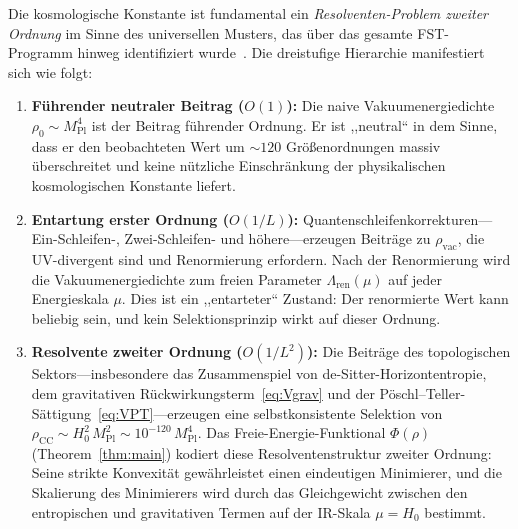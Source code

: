 \documentclass[12pt,a4paper]{article}
\theoremstyle{definition}
\theoremstyle{plain}
\theoremstyle{remark}
\begin{document}
Die kosmologische Konstante ist fundamental ein
\emph{Resolventen-Problem zweiter Ordnung} im Sinne des universellen
Musters, das \"uber das gesamte FST-Programm hinweg identifiziert
wurde~\cite{FST-Unified2026,GeigerRH2026c}. Die dreistufige Hierarchie
manifestiert sich wie folgt:

\begin{enumerate}
  \item \textbf{F\"uhrender neutraler Beitrag ($O(1)$):}\; Die naive
        Vakuumenergiedichte $\rho_0 \sim M_{\mathrm{Pl}}^4$ ist der
        Beitrag f\"uhrender Ordnung. Er ist ,,neutral`` in dem Sinne,
        dass er den beobachteten Wert um $\sim 120$ Gr\"o\ss enordnungen
        massiv \"uberschreitet und keine n\"utzliche Einschr\"ankung der
        physikalischen kosmologischen Konstante liefert.
  \item \textbf{Entartung erster Ordnung ($O(1/L)$):}\;
        Quantenschleifenkorrekturen---Ein-Schleifen-, Zwei-Schleifen- und
        h\"ohere---erzeugen Beitr\"age zu $\rho_{\mathrm{vac}}$, die
        UV-divergent sind und Renormierung erfordern. Nach der
        Renormierung wird die Vakuumenergiedichte zum freien Parameter
        $\Lambda_{\mathrm{ren}}(\mu)$ auf jeder Energieskala $\mu$. Dies
        ist ein ,,entarteter`` Zustand: Der renormierte Wert kann beliebig
        sein, und kein Selektionsprinzip wirkt auf dieser Ordnung.
  \item \textbf{Resolvente zweiter Ordnung ($O(1/L^2)$):}\; Die
        Beitr\"age des topologischen Sektors---insbesondere das
        Zusammenspiel von de-Sitter-Horizontentropie, dem gravitativen
        R\"uckwirkungsterm~\eqref{eq:Vgrav} und der
        P\"oschl--Teller-S\"attigung~\eqref{eq:VPT}---erzeugen eine
        selbstkonsistente Selektion von $\rho_{\mathrm{CC}} \sim
        H_0^2\,M_{\mathrm{Pl}}^2 \sim 10^{-120}\,M_{\mathrm{Pl}}^4$.
        Das Freie-Energie-Funktional $\Phi(\rho)$
        (Theorem~\ref{thm:main}) kodiert diese
        Resolventenstruktur zweiter Ordnung: Seine strikte Konvexit\"at
        gew\"ahrleistet einen eindeutigen Minimierer, und die Skalierung
        des Minimierers wird durch das Gleichgewicht zwischen den
        entropischen und gravitativen Termen auf der IR-Skala
        $\mu = H_0$ bestimmt.
\end{enumerate}
\end{document}
